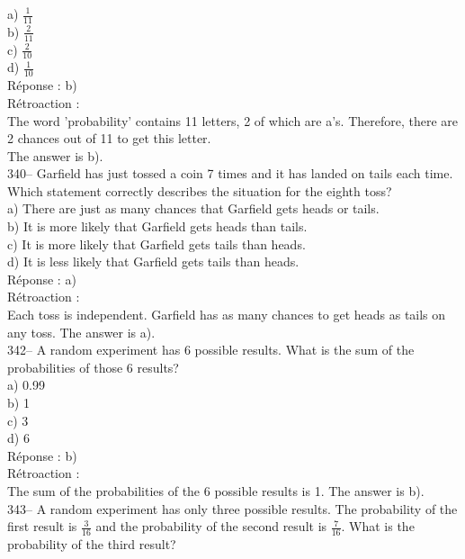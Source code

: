 \documentclass[letterpaper, 12pt]{article}
\begin{document}
a) $\frac{1}{11}$\\[2mm]
b) $\frac{2}{11}$\\[2mm]
c) $\frac{2}{10}$\\[2mm]
d) $\frac{1}{10}$\\

R\'eponse : b)\\

R\'etroaction : \\
The word 'probability' contains 11 letters, 2 of which are a's. Therefore, there are 2 chances out of 11 to get this letter.\\[2mm]
The answer is b).\\

340-- Garfield has just tossed a coin 7 times and it has landed on tails each time. Which statement correctly describes the situation for the eighth toss?\\

a) There are just as many chances that Garfield gets heads or tails.\\
b) It is more likely that Garfield gets heads than tails.\\
c) It is more likely that Garfield gets tails than heads.\\
d) It is less likely that Garfield gets tails than heads.\\

R\'eponse : a)\\

R\'etroaction : \\
Each toss is independent. Garfield has as many chances to get heads as tails on any toss. The answer is a).\\


342-- A random experiment has 6 possible results. What is the sum of the probabilities of those 6 results?\\

a) 0.99\\
b) 1\\
c) 3 \\
d) 6\\

R\'eponse : b)\\

R\'etroaction : \\
The sum of the probabilities of the 6 possible results is 1. The answer is b).\\

343-- A random experiment has only three possible results. The probability of the first result is $\frac{3}{16}$ and the probability of the second result is $\frac{7}{16}$. What is the probability of the third result?\\
\end{document}
